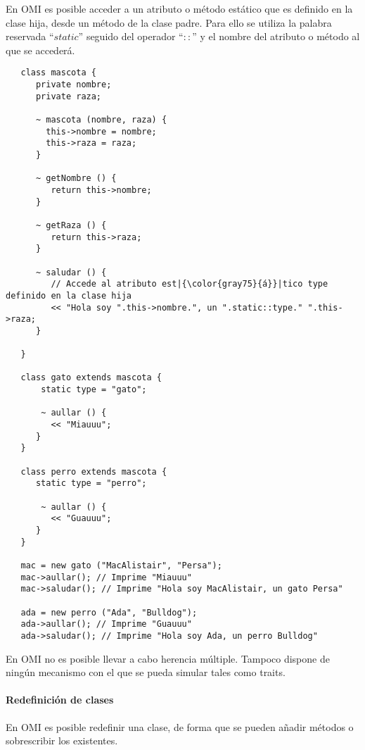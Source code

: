 En OMI es posible acceder a un atributo o método estático que es definido en la clase hija, desde un método de
la clase padre. Para ello se utiliza la palabra reservada ``$static$'' seguido del operador ``$::$'' y el 
nombre del atributo o método al que se accederá. \\

\begin{lstlisting}
   class mascota {
      private nombre; 
      private raza;
      
      ~ mascota (nombre, raza) { 
        this->nombre = nombre; 
        this->raza = raza;
      }
      
      ~ getNombre () {
         return this->nombre;
      }
      
      ~ getRaza () {
         return this->raza;
      }
      
      ~ saludar () {
         // Accede al atributo est|{\color{gray75}{á}}|tico type definido en la clase hija
         << "Hola soy ".this->nombre.", un ".static::type." ".this->raza;  
      }
      
   }

   class gato extends mascota {
       static type = "gato";
       
       ~ aullar () { 
         << "Miauuu";
      }
   }

   class perro extends mascota {
      static type = "perro";
       
       ~ aullar () { 
         << "Guauuu";
      }
   }
   
   mac = new gato ("MacAlistair", "Persa"); 
   mac->aullar(); // Imprime "Miauuu"
   mac->saludar(); // Imprime "Hola soy MacAlistair, un gato Persa"
   
   ada = new perro ("Ada", "Bulldog"); 
   ada->aullar(); // Imprime "Guauuu"
   ada->saludar(); // Imprime "Hola soy Ada, un perro Bulldog"

\end{lstlisting}



En OMI no es posible llevar a cabo herencia múltiple. Tampoco dispone de ningún
mecanismo con el que se pueda simular tales como traits. 

\paragraph{Redefinición de clases}
En OMI es posible redefinir una clase, de forma que se pueden añadir métodos o sobrescribir los 
existentes. 

